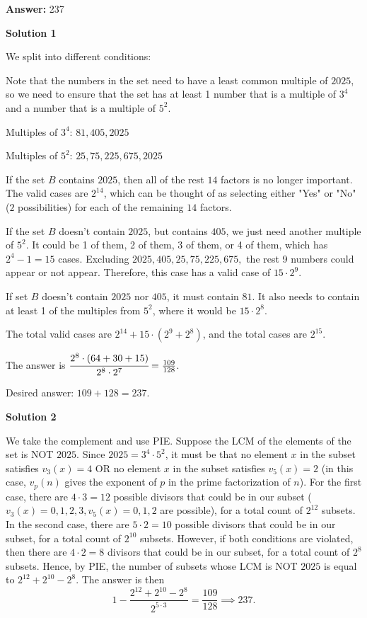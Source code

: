 \begin{enumerate}
 
 \textbf{Answer: }237



\textbf{Solution 1}

We split into different conditions:

 Note that the numbers in the set need to have a least common multiple of $2025$, so we need to ensure that the set has at least 1 number that is a multiple of $3^4$ and a number that is a multiple of $5^2$. 

 Multiples of $3^4$: $81, 405, 2025$

 Multiples of $5^2$: $25, 75, 225, 675, 2025$

 If the set $B$ contains $2025$, then all of the rest $14$ factors is no longer important. The valid cases are $2^{14}$, which can be thought of as selecting either "Yes" or "No" ($2$ possibilities) for each of the remaining $14$ factors.

 If the set $B$ doesn't contain $2025$, but contains $405$, we just need another multiple of $5^2$. It could be 1 of them, 2 of them, 3 of them, or 4 of them, which has $2^4 - 1 = 15$ cases. Excluding $2025, 405, 25, 75, 225, 675,$ the rest 9 numbers could appear or not appear. Therefore, this case has a valid case of $15 \cdot 2^9$. 

 If set $B$ doesn't contain $2025$ nor $405$, it must contain $81$. It also needs to contain at least 1 of the multiples from $5^2$, where it would be $15 \cdot 2^8$. 

 The total valid cases are $2^{14} + 15 \cdot (2^9 + 2^8)$, and the total cases are $2^{15}$. 

 The answer is $\cfrac{2^8 \cdot (64 + 30 + 15)}{2^8 \cdot 2^7}= \frac{109}{128}$. 

 Desired answer: $109 + 128 = \boxed{237}$.

 



\textbf{Solution 2}

We take the complement and use PIE. Suppose the LCM of the elements of the set is NOT $2025$. Since $2025=3^4 \cdot 5^2$, it must be that no element $x$ in the subset satisfies $v_3(x)=4$ OR no element $x$ in the subset satisfies $v_5(x)=2$ (in this case, $v_p(n)$ gives the exponent of $p$ in the prime factorization of $n$). For the first case, there are $4 \cdot 3 = 12$ possible divisors that could be in our subset ($v_3(x)=0,1,2,3,v_5(x)=0,1,2$ are possible), for a total count of $2^{12}$ subsets. In the second case, there are $5 \cdot 2 = 10$ possible divisors that could be in our subset, for a total count of $2^{10}$ subsets. However, if both conditions are violated, then there are $4 \cdot 2 = 8$ divisors that could be in our subset, for a total count of $2^8$ subsets. Hence, by PIE, the number of subsets whose LCM is NOT $2025$ is equal to $2^{12}+2^{10}-2^8$. The answer is then 
 \[1-\frac{2^{12}+2^{10}-2^8}{2^{5 \cdot 3}}=\frac{109}{128} \implies \boxed{237}.\]





\end{enumerate}
